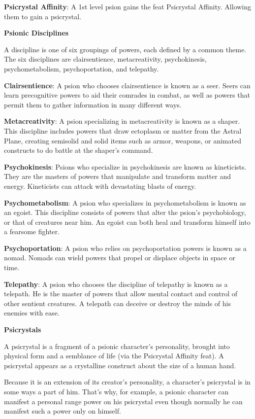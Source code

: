 \textbf{Psicrystal Affinity}: A 1st level psion gains the feat Psicrystal Affinity. Allowing them to gain a psicrystal.

\textbf{\large{Psionic Disciplines}}

A discipline is one of six groupings of powers, each defined by a common theme. The six disciplines are clairsentience, metacreativity, psychokinesis, psychometabolism, psychoportation, and telepathy.

\textbf{Clairsentience}: A psion who chooses clairsentience is known as a seer. Seers can learn precognitive powers to aid their comrades in combat, as well as powers that permit them to gather information in many different ways.

\textbf{Metacreativity}: A psion specializing in metacreativity is known as a shaper. This discipline includes powers that draw ectoplasm or matter from the Astral Plane, creating semisolid and solid items such as armor, weapons, or animated constructs to do battle at the shaper's command.

\textbf{Psychokinesis}: Psions who specialize in psychokinesis are known as kineticists. They are the masters of powers that manipulate and transform matter and energy. Kineticists can attack with devastating blasts of energy.

\textbf{Psychometabolism}: A psion who specializes in psychometabolism is known as an egoist. This discipline consists of powers that alter the psion's psychobiology, or that of creatures near him. An egoist can both heal and transform himself into a fearsome fighter.

\textbf{Psychoportation}: A psion who relies on psychoportation powers is known as a nomad. Nomads can wield powers that propel or displace objects in space or time.

\textbf{Telepathy}: A psion who chooses the discipline of telepathy is known as a telepath. He is the master of powers that allow mental contact and control of other sentient creatures. A telepath can deceive or destroy the minds of his enemies with ease.

\textbf{\large{Psicrystals}}

A psicrystal is a fragment of a psionic character's personality, brought into physical form and a semblance of life (via the Psicrystal Affinity feat). A psicrystal appears as a crystalline construct about the size of a human hand.

Because it is an extension of its creator's personality, a character's psicrystal is in some ways a part of him. That's why, for example, a psionic character can manifest a personal range power on his psicrystal even though normally he can manifest such a power only on himself.


